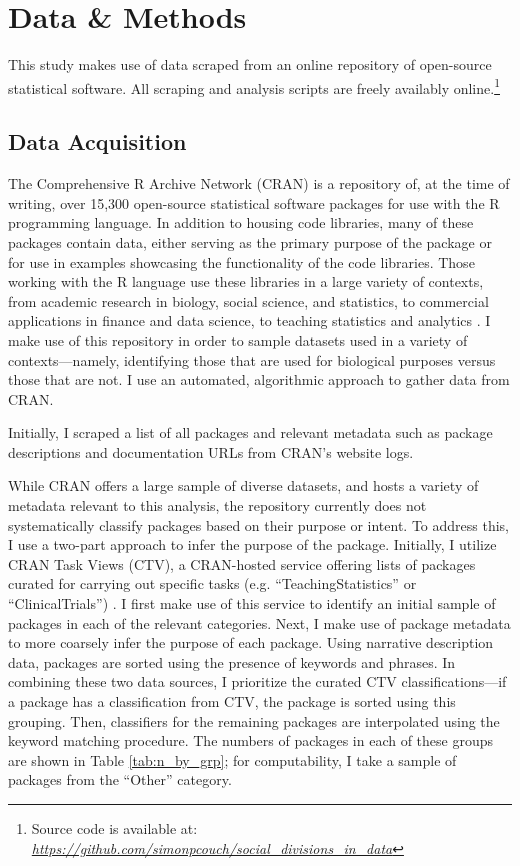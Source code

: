 \section{Data \& Methods}\label{sec:methods}

\hspace{13pt} This study makes use of data scraped from an online repository of open-source statistical software. All scraping and analysis scripts are freely availably online.\footnote{Source code is available at: \href{https://github.com/simonpcouch/social_divisions_in_data}{\textit{https://github.com/simonpcouch/social\_divisions\_in\_data}}}

\subsection{Data Acquisition}\label{sec:data}

\hspace{13pt} The Comprehensive R Archive Network (CRAN) is a repository of, at the time of writing, over 15,300 open-source statistical software packages for use with the R programming language. In addition to housing code libraries, many of these packages contain data, either serving as the primary purpose of the package or for use in examples showcasing the functionality of the code libraries. Those working with the R language use these libraries in a large variety of contexts, from academic research in biology, social science, and statistics, to commercial applications in finance and data science, to teaching statistics and analytics \cite{hornik2012comprehensive}. I make use of this repository in order to sample datasets used in a variety of contexts---namely, identifying those that are used for biological purposes versus those that are not. I use an automated, algorithmic approach to gather data from CRAN.

Initially, I scraped a list of all packages and relevant metadata such as package descriptions and documentation URLs from CRAN's website logs. 

While CRAN offers a large sample of diverse datasets, and hosts a variety of metadata relevant to this analysis, the repository currently does not systematically classify packages based on their purpose or intent. To address this, I use a two-part approach to infer the purpose of the package. Initially, I utilize CRAN Task Views (CTV), a CRAN-hosted service offering lists of packages curated for carrying out specific tasks (e.g. ``TeachingStatistics'' or  ``ClinicalTrials'') \cite{zeileis2005cran}. I first make use of this service to identify an initial sample of packages in each of the relevant categories. Next, I make use of package metadata to more coarsely infer the purpose of each package. Using narrative description data, packages are sorted using the presence of keywords and phrases. In combining these two data sources, I prioritize the curated CTV classifications---if a package has a classification from CTV, the package is sorted using this grouping. Then, classifiers for the remaining packages are interpolated using the keyword matching procedure. The numbers of packages in each of these groups are shown in Table \ref{tab:n_by_grp}; for computability, I take a sample of packages from the ``Other'' category.

